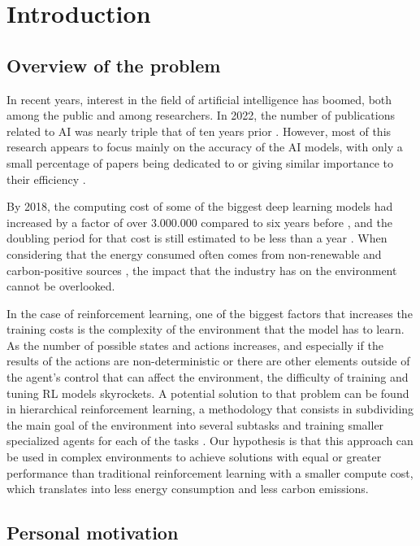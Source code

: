 \chapter{Introduction}
\label{chapter:introduction}

\section{Overview of the problem}

In recent years, interest in the field of artificial intelligence has boomed, both among the public and among researchers. In 2022, the number of publications related to AI was nearly triple that of ten years prior \cite{Nestor:2024}. However, most of this research appears to focus mainly on the accuracy of the AI models, with only a small percentage of papers being dedicated to or giving similar importance to their efficiency \cite{Schwartz:2019}.

By 2018, the computing cost of some of the biggest deep learning models had increased by a factor of over 3.000.000 compared to six years before \cite{Amodei:2018}, and the doubling period for that cost is still estimated to be less than a year \cite{Jaime:2022}. When considering that the energy consumed often comes from non-renewable and carbon-positive sources \cite{Strubell:2019}, the impact that the industry has on the environment cannot be overlooked.

In the case of reinforcement learning, one of the biggest factors that increases the training costs is the complexity of the environment that the model has to learn. As the number of possible states and actions increases, and especially if the results of the actions are non-deterministic or there are other elements outside of the agent's control that can affect the environment, the difficulty of training and tuning RL models skyrockets. A potential solution to that problem can be found in hierarchical reinforcement learning, a methodology that consists in subdividing the main goal of the environment into several subtasks and training smaller specialized agents for each of the tasks \cite{Barto:2003, Al-Emran:2015, Pateria:2021}. Our hypothesis is that this approach can be used in complex environments to achieve solutions with equal or greater performance than traditional reinforcement learning with a smaller compute cost, which translates into less energy consumption and less carbon emissions.

\section{Personal motivation}


